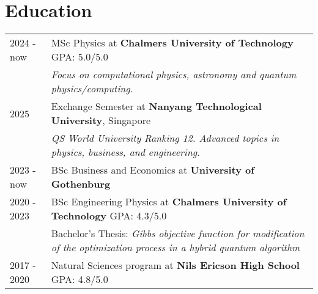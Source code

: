 \documentclass[a4paper,11pt]{article}
\begin{document}

\section{Education}
\begin{tabularx}{\linewidth}{@{}l X@{}}	
2024 - now &MSc Physics at \textbf{Chalmers University of Technology} \hfill GPA: 5.0/5.0\\
&\textit{Focus on computational physics, astronomy and quantum physics/computing.} \\[5pt]

2025 &Exchange Semester at \textbf{Nanyang Technological University}, Singapore \\
&\textit{QS World University Ranking 12. Advanced topics in physics, business, and engineering.} \\[5pt]

2023 - now &BSc Business and Economics at \textbf{University of Gothenburg} \hfill \\[5pt] 

2020 - 2023 &BSc Engineering Physics at \textbf{Chalmers University of Technology} \hfill GPA: 4.3/5.0\\
&Bachelor's Thesis: \textit{Gibbs objective function for modification of the optimization process in a hybrid quantum algorithm} \\[18pt]

2017 - 2020 &Natural Sciences program at \textbf{Nils Ericson High School} \hfill GPA: 4.8/5.0
\end{tabularx}
\end{document}
